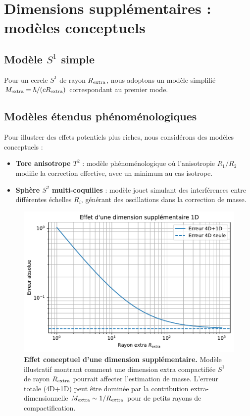 \documentclass[11pt]{article}
\begin{document}
\section{Dimensions suppl\'ementaires : mod\`eles conceptuels}
\subsection{Mod\`ele $S^1$ simple}
Pour un cercle $S^1$ de rayon $R_{\rm extra}$, nous adoptons un mod\`ele simplifi\'e $M_{\rm extra}=\hbar/(c R_{\rm extra})$ correspondant au premier mode.

\subsection{Mod\`eles \'etendus ph\'enom\'enologiques}
Pour illustrer des effets potentiels plus riches, nous consid\'erons des mod\`eles conceptuels : 
\begin{itemize}
\item \textbf{Tore anisotrope $T^2$} : mod\`ele ph\'enom\'enologique o\`u l'anisotropie $R_1/R_2$ modifie la correction effective, avec un minimum au cas isotrope.
\item \textbf{Sph\`ere $S^2$ multi-coquilles} : mod\`ele jouet simulant des interf\'erences entre diff\'erentes \'echelles $R_i$, g\'en\'erant des oscillations dans la correction de masse.
\end{itemize}

\begin{figure}[!htb]
\centering
\includegraphics[width=.75\linewidth]{fig_extra_dimension_effect_improved.pdf}
\caption{\textbf{Effet conceptuel d'une dimension supplémentaire.} Modèle illustratif montrant comment une dimension extra compactifiée $S^1$ de rayon $R_{\rm extra}$ pourrait affecter l'estimation de masse. L'erreur totale (4D+1D) peut être dominée par la contribution extra-dimensionnelle $M_{\rm extra} \sim 1/R_{\rm extra}$ pour de petits rayons de compactification.}
\end{figure}
\end{document}
